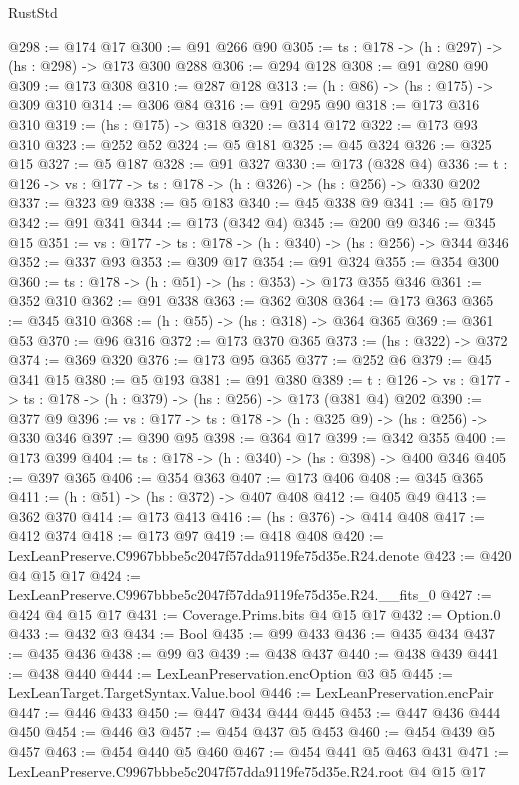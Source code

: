 \begin{lexlean}{RustStd}
\begin{coremodule}
@298 := @174 @17
@300 := @91 @266 @90
@305 := {ts : @178} -> (h : @297) -> (hs : @298) -> @173 @300 @288
@306 := @294 @128
@308 := @91 @280 @90
@309 := @173 @308
@310 := @287 @128
@313 := (h : @86) -> (hs : @175) -> @309 @310
@314 := @306 @84
@316 := @91 @295 @90
@318 := @173 @316 @310
@319 := (hs : @175) -> @318
@320 := @314 @172
@322 := @173 @93 @310
@323 := @252 @52
@324 := @5 @181
@325 := @45 @324
@326 := @325 @15
@327 := @5 @187
@328 := @91 @327
@330 := @173 (@328 @4)
@336 := {t : @126} -> {vs : @177} -> {ts : @178} -> (h : @326) -> (hs : @256) -> @330 @202
@337 := @323 @9
@338 := @5 @183
@340 := @45 @338 @9
@341 := @5 @179
@342 := @91 @341
@344 := @173 (@342 @4)
@345 := @200 @9
@346 := @345 @15
@351 := {vs : @177} -> {ts : @178} -> (h : @340) -> (hs : @256) -> @344 @346
@352 := @337 @93
@353 := @309 @17
@354 := @91 @324
@355 := @354 @300
@360 := {ts : @178} -> (h : @51) -> (hs : @353) -> @173 @355 @346
@361 := @352 @310
@362 := @91 @338
@363 := @362 @308
@364 := @173 @363
@365 := @345 @310
@368 := (h : @55) -> (hs : @318) -> @364 @365
@369 := @361 @53
@370 := @96 @316
@372 := @173 @370 @365
@373 := (hs : @322) -> @372
@374 := @369 @320
@376 := @173 @95 @365
@377 := @252 @6
@379 := @45 @341 @15
@380 := @5 @193
@381 := @91 @380
@389 := {t : @126} -> {vs : @177} -> {ts : @178} -> (h : @379) -> (hs : @256) -> @173 (@381 @4) @202
@390 := @377 @9
@396 := {vs : @177} -> {ts : @178} -> (h : @325 @9) -> (hs : @256) -> @330 @346
@397 := @390 @95
@398 := @364 @17
@399 := @342 @355
@400 := @173 @399
@404 := {ts : @178} -> (h : @340) -> (hs : @398) -> @400 @346
@405 := @397 @365
@406 := @354 @363
@407 := @173 @406
@408 := @345 @365
@411 := (h : @51) -> (hs : @372) -> @407 @408
@412 := @405 @49
@413 := @362 @370
@414 := @173 @413
@416 := (hs : @376) -> @414 @408
@417 := @412 @374
@418 := @173 @97
@419 := @418 @408
@420 := LexLeanPreserve.C9967bbbe5c2047f57dda9119fe75d35e.R24.denote
@423 := @420 @4 @15 @17
@424 := LexLeanPreserve.C9967bbbe5c2047f57dda9119fe75d35e.R24.__fits_0
@427 := @424 @4 @15 @17
@431 := Coverage.Prims.bits @4 @15 @17
@432 := Option.{0}
@433 := @432 @3
@434 := Bool
@435 := @99 @433
@436 := @435 @434
@437 := @435 @436
@438 := @99 @3
@439 := @438 @437
@440 := @438 @439
@441 := @438 @440
@444 := LexLeanPreservation.encOption @3 @5
@445 := LexLeanTarget.TargetSyntax.Value.bool
@446 := LexLeanPreservation.encPair
@447 := @446 @433
@450 := @447 @434 @444 @445
@453 := @447 @436 @444 @450
@454 := @446 @3
@457 := @454 @437 @5 @453
@460 := @454 @439 @5 @457
@463 := @454 @440 @5 @460
@467 := @454 @441 @5 @463 @431
@471 := LexLeanPreserve.C9967bbbe5c2047f57dda9119fe75d35e.R24.root @4 @15 @17

\end{coremodule}
\end{lexlean}
